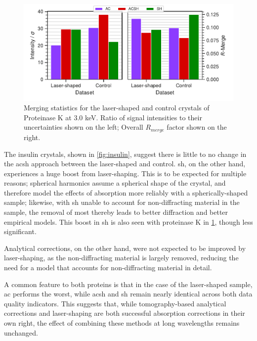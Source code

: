 
\begin{figure}[h]
    \centering
    \includegraphics{plots/exp2/prot_stats.pdf}
    \caption{Merging statistics for the laser-shaped and control crystals of Proteinase K at 3.0 \unit{keV}. Ratio of signal intensities to their uncertainties shown on the left; Overall $R_{merge}$ factor shown on the right.}
    \label{fig:proteinasek}
\end{figure}

The insulin crystals, shown in \cref{fig:insulin}, suggest there is little to no change in the \ac{acsh} approach between the laser-shaped and control. \Ac{sh}, on the other hand, experiences a huge boost from laser-shaping. This is to be expected for multiple reasons; spherical harmonics assume a spherical shape of the crystal, and therefore model the effects of absorption more reliably with a spherically-shaped sample; likewise, with \ac{sh} unable to account for non-diffracting material in the sample, the removal of most thereby leads to better diffraction and better empirical models. This boost in \ac{sh} is also seen with proteinase K in \cref{fig:proteinasek}, though less significant.

Analytical corrections, on the other hand, were not expected to be improved by laser-shaping, as the non-diffracting material is largely removed, reducing the need for a model that accounts for non-diffracting material in detail.

A common feature to both proteins is that in the case of the laser-shaped sample, \ac{ac} performs the worst, while \ac{acsh} and \ac{sh} remain nearly identical across both data quality indicators. This suggests that, while tomography-based analytical corrections and laser-shaping are both successful absorption corrections in their own right, the effect of combining these methods at long wavelengths remains unchanged.

